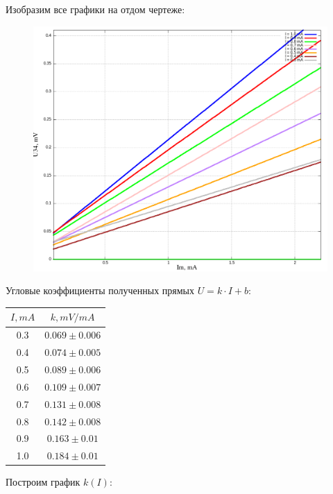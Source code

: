 \documentclass{article}
\begin{document}
Изобразим все графики на отдом чертеже:

\begin{figure}[H]
    \centering
    \includegraphics[width=\textwidth]{multy-plot.png}
\end{figure}
    

Угловые коэффициенты полученных прямых \( U = k \cdot I + b \):

\begin{table}[H]
    \centering
    \begin{tabular}{|c|c|}
        \hline
        \( I, mA \) & \( k, mV/mA \) \\\hline
        0.3 & \( 0.069 \pm 0.006 \)  \\\hline
        0.4 & \( 0.074 \pm 0.005 \) \\\hline
        0.5 & \( 0.089 \pm 0.006 \) \\\hline
        0.6 & \( 0.109 \pm 0.007 \) \\\hline
        0.7 & \( 0.131 \pm 0.008 \) \\\hline
        0.8 & \( 0.142 \pm 0.008 \) \\\hline
        0.9 & \( 0.163 \pm 0.01 \)  \\\hline
        1.0 & \( 0.184 \pm 0.01 \)  \\\hline
    \end{tabular}
\end{table}

Построим график \( k(I) \):
\end{document}
